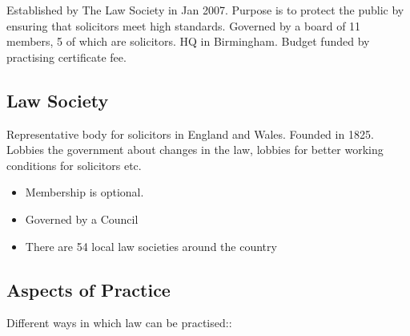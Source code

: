 \documentclass[
]{article}
\providecommand{\tightlist}{%
  \setlength{\itemsep}{0pt}\setlength{\parskip}{0pt}}
\begin{document}
Established by The Law Society in Jan 2007. Purpose is to protect the
public by ensuring that solicitors meet high standards. Governed by a
board of 11 members, 5 of which are solicitors. HQ in Birmingham. Budget
funded by practising certificate fee.

\hypertarget{law-society}{%
\subsection{Law Society}\label{law-society}}

Representative body for solicitors in England and Wales. Founded in
1825. Lobbies the government about changes in the law, lobbies for
better working conditions for solicitors etc.

\begin{itemize}
\tightlist
\item
  Membership is optional.
\item
  Governed by a Council
\item
  There are 54 local law societies around the country
\end{itemize}

\hypertarget{aspects-of-practice}{%
\subsection{Aspects of Practice}\label{aspects-of-practice}}

Different ways in which law can be practised::
\end{document}
